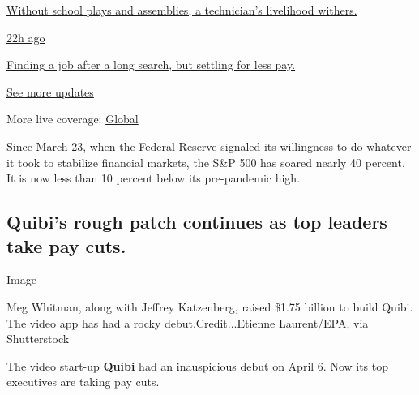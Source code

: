 \href{https://www.nytimes3xbfgragh.onion/live/2020/08/20/business/stock-market-today-coronavirus?action=click\&pgtype=Article\&state=default\&region=MAIN_CONTENT_1\&context=storylines_live_updates\#without-school-plays-and-assemblies-a-technicians-livelihood-withers}{Without
school plays and assemblies, a technician's livelihood withers.}

\href{https://www.nytimes3xbfgragh.onion/live/2020/08/20/business/stock-market-today-coronavirus?action=click\&pgtype=Article\&state=default\&region=MAIN_CONTENT_1\&context=storylines_live_updates\#finding-a-job-after-a-long-search-but-settling-for-less-pay}{22h
ago}

\href{https://www.nytimes3xbfgragh.onion/live/2020/08/20/business/stock-market-today-coronavirus?action=click\&pgtype=Article\&state=default\&region=MAIN_CONTENT_1\&context=storylines_live_updates\#finding-a-job-after-a-long-search-but-settling-for-less-pay}{Finding
a job after a long search, but settling for less pay.}

\href{https://www.nytimes3xbfgragh.onion/live/2020/08/20/business/stock-market-today-coronavirus?action=click\&pgtype=Article\&state=default\&region=MAIN_CONTENT_1\&context=storylines_live_updates}{See
more updates}

More live coverage:
\href{https://www.nytimes3xbfgragh.onion/2020/08/21/world/covid-19-coronavirus.html?action=click\&pgtype=Article\&state=default\&region=MAIN_CONTENT_1\&context=storylines_live_updates}{Global}

Since March 23, when the Federal Reserve signaled its willingness to do
whatever it took to stabilize financial markets, the S\&P 500 has soared
nearly 40 percent. It is now less than 10 percent below its pre-pandemic
high.

\hypertarget{quibis-rough-patch-continues-as-top-leaders-take-pay-cuts}{%
\subsection{Quibi's rough patch continues as top leaders take pay
cuts.}\label{quibis-rough-patch-continues-as-top-leaders-take-pay-cuts}}

Image

Meg Whitman, along with Jeffrey Katzenberg, raised \$1.75 billion to
build Quibi. The video app has had a rocky debut.Credit...Etienne
Laurent/EPA, via Shutterstock

The video start-up \textbf{Quibi} had an inauspicious debut on April 6.
Now its top executives are taking pay cuts.

